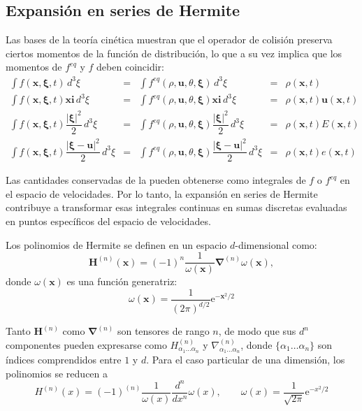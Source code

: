 \subsection{Expansi\'on en series de Hermite}
Las bases de la teor\'ia cin\'etica muestran que el operador de colisi\'on preserva ciertos momentos de la funci\'on de distribuci\'on, lo que a su vez implica que los momentos de $f^{eq}$ y $f$ deben coincidir:
\begin{subequations}
	\begin{align}
		\int f(\bm{x},\bm{\xi},t) \, d^3 \xi &=& \int f^{eq}(\rho, \bm{u},\theta,\bm{\xi}) \, d^3 \xi &=& \rho(\bm{x},t)\\
		\int f(\bm{x},\bm{\xi},t) \bm{xi}\, d^3 \xi &=& \int f^{eq}(\rho, \bm{u},\theta,\bm{\xi}) \bm{xi}\, d^3 \xi &=& \rho(\bm{x},t)\bm{u}(\bm{x},t)\\
		\int f(\bm{x},\bm{\xi},t) \dfrac{|\bm{\xi}|^2}{2} \, d^3 \xi &=& \int f^{eq}(\rho, \bm{u},\theta,\bm{\xi}) \dfrac{|\bm{\xi}|^2}{2} \, d^3 \xi &=& \rho(\bm{x},t)E(\bm{x},t)\\		
		\int f(\bm{x},\bm{\xi},t) \dfrac{|\bm{\xi}-\bm{u}|^2}{2} \, d^3 \xi &=& \int f^{eq}(\rho, \bm{u},\theta,\bm{\xi}) \dfrac{|\bm{\xi}-\bm{u}|^2}{2} \, d^3 \xi &=& \rho(\bm{x},t)e(\bm{x},t)		
	\end{align}
	\label{eq:cons_moments}	
\end{subequations}

Las cantidades conservadas de la  pueden obtenerse como integrales de $f$ o $f^{eq}$ en el espacio de velocidades. Por lo tanto, la expansi\'on en series de Hermite contribuye a transformar esas integrales continuas en sumas discretas evaluadas en puntos espec\'ificos del espacio de velocidades.
\par
Los polinomios de Hermite se definen en un espacio $d$-dimensional como: \cite{shan_kinetic_2006,grad_kinetic_1949}
\begin{equation}
	\bm{H}^{(n)} (\bm{x})= (-1)^n\dfrac{1}{\omega (\bm{x})} \bm{\nabla}^{(n)}\omega(\bm{x}),
\end{equation}
donde $\omega(\bm{x})$ es una funci\'on generatriz:
\begin{equation}
	\omega(\bm{x}) = \dfrac{1}{(2\pi)^{d/2}}\mbox{e}^{-\bm{x}^2/2}
\end{equation}

Tanto $\bm{H}^{(n)}$ como $\bm{\nabla}^{(n)}$ son tensores de rango $n$, de modo que sus $d^n$ componentes pueden expresarse como $H^{(n)}_{\alpha_1 \ldots \alpha_n}$ y $\nabla^{(n)}_{\alpha_1 \ldots \alpha_n}$, donde $\{\alpha_1 \ldots \alpha_n\}$ son \'indices comprendidos entre $1$ y $d$. Para el caso particular de una dimensi\'on, los polinomios se reducen a
\begin{equation}
	H^{(n)}(x)=(-1)^{(n)} \dfrac{1}{\omega(x)} \dfrac{d^n}{dx^n}\omega(x), \qquad 
	\omega(x) = \dfrac{1}{\sqrt{2\pi}}\mbox{e}^{-x^2/2}
\end{equation}

